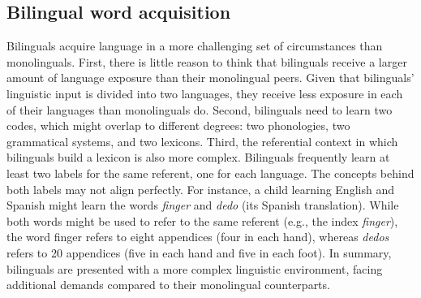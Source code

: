 \documentclass[
  12pt,
  b5paperpaper,
  twoside]{scrreprt}
\begin{document}
\hypertarget{bilingual-word-acquisition}{%
\subsection{Bilingual word
acquisition}\label{bilingual-word-acquisition}}

Bilinguals acquire language in a more challenging set of circumstances
than monolinguals. First, there is little reason to think that
bilinguals receive a larger amount of language exposure than their
monolingual peers. Given that bilinguals' linguistic input is divided
into two languages, they receive less exposure in each of their
languages than monolinguals do. Second, bilinguals need to learn two
codes, which might overlap to different degrees: two phonologies, two
grammatical systems, and two lexicons. Third, the referential context in
which bilinguals build a lexicon is also more complex. Bilinguals
frequently learn at least two labels for the same referent, one for each
language. The concepts behind both labels may not align perfectly. For
instance, a child learning English and Spanish might learn the words
\emph{finger} and \emph{dedo} (its Spanish translation). While both
words might be used to refer to the same referent (e.g., the index
\emph{finger}), the word finger refers to eight appendices (four in each
hand), whereas \emph{dedos} refers to 20 appendices (five in each hand
and five in each foot). In summary, bilinguals are presented with a more
complex linguistic environment, facing additional demands compared to
their monolingual counterparts.
\end{document}
